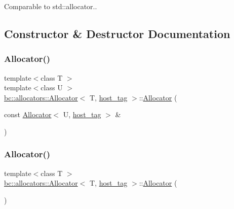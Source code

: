Comparable to \textquotesingle{}std\+::allocator.\textquotesingle{}. 

\subsection{Constructor \& Destructor Documentation}
\mbox{\label{structbc_1_1allocators_1_1Allocator_3_01T_00_01host__tag_01_4_ab3c8ab0bb3be8497097288b6164c3549}} 
\subsubsection{\texorpdfstring{Allocator()}{Allocator()}\hspace{0.1cm}{\footnotesize\ttfamily [1/2]}}
{\footnotesize\ttfamily template$<$class T $>$ \\
template$<$class U $>$ \\
\hyperlink{classbc_1_1allocators_1_1Allocator}{bc\+::allocators\+::\+Allocator}$<$ T, \hyperlink{structbc_1_1host__tag}{host\+\_\+tag} $>$\+::\hyperlink{classbc_1_1allocators_1_1Allocator}{Allocator} (\begin{DoxyParamCaption}\item[{const \hyperlink{classbc_1_1allocators_1_1Allocator}{Allocator}$<$ U, \hyperlink{structbc_1_1host__tag}{host\+\_\+tag} $>$ \&}]{ }\end{DoxyParamCaption})\hspace{0.3cm}{\ttfamily [inline]}}

\mbox{\label{structbc_1_1allocators_1_1Allocator_3_01T_00_01host__tag_01_4_a74632d8f2485cc5fbbc1942674263ecd}} 
\subsubsection{\texorpdfstring{Allocator()}{Allocator()}\hspace{0.1cm}{\footnotesize\ttfamily [2/2]}}
{\footnotesize\ttfamily template$<$class T $>$ \\
\hyperlink{classbc_1_1allocators_1_1Allocator}{bc\+::allocators\+::\+Allocator}$<$ T, \hyperlink{structbc_1_1host__tag}{host\+\_\+tag} $>$\+::\hyperlink{classbc_1_1allocators_1_1Allocator}{Allocator} (\begin{DoxyParamCaption}{ }\end{DoxyParamCaption})\hspace{0.3cm}{\ttfamily [default]}}



